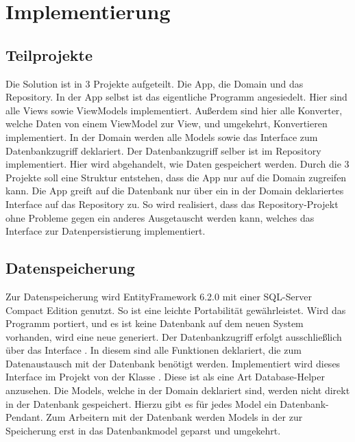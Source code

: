 \section{Implementierung}

\subsection{Teilprojekte}


Die Solution ist in 3 Projekte aufgeteilt. Die App, die Domain und das Repository. In der App selbst ist das eigentliche Programm angesiedelt. Hier sind alle Views sowie ViewModels implementiert. Außerdem sind hier alle Konverter, welche Daten von einem ViewModel zur View, und umgekehrt, Konvertieren implementiert. In der Domain werden alle Models sowie das Interface zum Datenbankzugriff deklariert. Der Datenbankzugriff selber ist im Repository implementiert. Hier wird abgehandelt, wie Daten gespeichert werden. Durch die 3 Projekte soll eine Struktur entstehen, dass die App nur auf die Domain zugreifen kann. Die App greift auf die Datenbank nur über ein in der Domain deklariertes Interface auf das Repository zu. So wird realisiert, dass das Repository-Projekt ohne Probleme gegen ein anderes Ausgetauscht werden kann, welches das Interface zur Datenpersistierung implementiert. 

\subsection{Datenspeicherung}
Zur Datenspeicherung wird EntityFramework 6.2.0 mit einer SQL-Server Compact Edition genutzt. So ist eine leichte Portabilität gewährleistet. Wird das Programm portiert, und es ist keine Datenbank auf dem neuen System vorhanden, wird eine neue generiert. Der Datenbankzugriff erfolgt ausschließlich über das Interface . In diesem sind alle Funktionen deklariert, die zum Datenaustausch mit der Datenbank benötigt werden. Implementiert wird dieses Interface im Projekt  von der Klasse . Diese ist als eine Art Database-Helper anzusehen. Die Models, welche in der Domain deklariert sind, werden nicht direkt in der Datenbank gespeichert. Hierzu gibt es für jedes Model ein Datenbank-Pendant. Zum Arbeitern mit der Datenbank werden Models in der  zur Speicherung erst in das Datenbankmodel geparst und umgekehrt.

